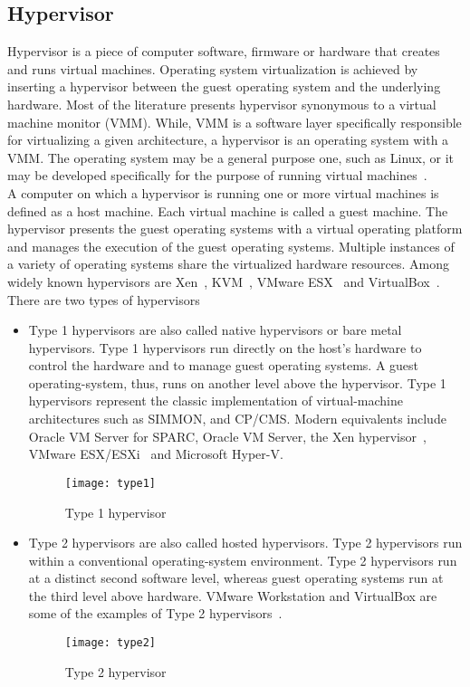\subsection{Hypervisor}
Hypervisor is a piece of computer software, firmware or hardware that creates and runs virtual machines. Operating system virtualization is achieved by inserting a hypervisor between the guest operating system and the underlying hardware. Most of the literature presents hypervisor synonymous to a virtual machine monitor (VMM). While, VMM is a software layer specifically responsible for virtualizing a given architecture, a hypervisor is an operating system with a VMM. The operating system may be a general purpose one, such as Linux, or it may be developed specifically for the purpose of running virtual machines~\cite{Agesen:2010:EXV:1899928.1899930}.
\\[3mm]
A computer on which a hypervisor is running one or more virtual machines is defined as a host machine. Each virtual machine is called a guest machine. The hypervisor presents the guest operating systems with a virtual operating platform and manages the execution of the guest operating systems. Multiple instances of a variety of operating systems share the virtualized hardware resources. Among widely known hypervisors are Xen~\cite{Barham:2003:XAV:1165389.945462, Chisnall:2007:DGX:1407351}, KVM~\cite{Habib:2008:VK:1344209.1344217, kivity07kvm}, VMware ESX~\cite{Agesen:2010:EXV:1899928.1899930} and VirtualBox~\cite{citeulike:3149886}.
\\[3mm]
There are two types of hypervisors~\cite{Goldberg:1973:AVM:800122.803950}
\begin{itemize}
\item Type 1 hypervisors are also called native hypervisors or bare metal hypervisors. Type 1 hypervisors run directly on the host's hardware to control the hardware and to manage guest operating systems. A guest operating-system, thus, runs on another level above the hypervisor. Type 1 hypervisors represent the classic implementation of virtual-machine architectures such as SIMMON, and CP/CMS. Modern equivalents include Oracle VM Server for SPARC, Oracle VM Server, the Xen hypervisor~\cite{Barham:2003:XAV:1165389.945462}, VMware ESX/ESXi~\cite{Agesen:2010:EXV:1899928.1899930} and Microsoft Hyper-V.
\begin{figure}[!ht]
\centering
\texttt{[image: type1]}
\caption{Type 1 hypervisor}
\label{Type 1 hypervisor}
\end{figure}
\item Type 2 hypervisors are also called hosted hypervisors. Type 2 hypervisors run within a conventional operating-system environment. Type 2 hypervisors run at a distinct second software level, whereas guest operating systems run at the third level above hardware. VMware Workstation and VirtualBox are some of the examples of Type 2 hypervisors~\cite{Sugerman:2001:VID:647055.715774, citeulike:3149886}.
\begin{figure}[!ht]
\centering
\texttt{[image: type2]}
\caption{Type 2 hypervisor}
\label{fig:Type 2 hypervisor}
\end{figure}
\end{itemize}

